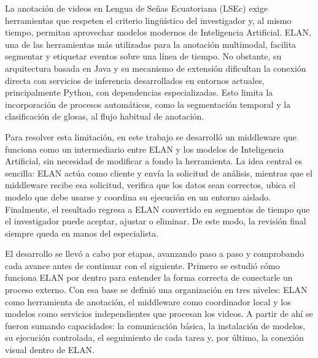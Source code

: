 
La anotación de videos en Lengua de Señas Ecuatoriana (LSEc) exige herramientas que respeten el criterio lingüístico del investigador y, al mismo tiempo, permitan aprovechar modelos modernos de Inteligencia Artificial. ELAN, una de las herramientas más utilizadas para la anotación multimodal, facilita segmentar y etiquetar eventos sobre una línea de tiempo. No obstante, su arquitectura basada en Java y su mecanismo de extensión dificultan la conexión directa con servicios de inferencia desarrollados en entornos actuales, principalmente Python, con dependencias especializadas. Esto limita la incorporación de procesos automáticos, como la segmentación temporal y la clasificación de glosas, al flujo habitual de anotación.

Para resolver esta limitación, en este trabajo se desarrolló un middleware que funciona como un intermediario entre ELAN y los modelos de Inteligencia Artificial, sin necesidad de modificar a fondo la herramienta. La idea central es sencilla: ELAN actúa como cliente y envía la solicitud de análisis, mientras que el middleware recibe esa solicitud, verifica que los datos sean correctos, ubica el modelo que debe usarse y coordina su ejecución en un entorno aislado. Finalmente, el resultado regresa a ELAN convertido en segmentos de tiempo que el investigador puede aceptar, ajustar o eliminar. De este modo, la revisión final siempre queda en manos del especialista.

El desarrollo se llevó a cabo por etapas, avanzando paso a paso y comprobando cada avance antes de continuar con el siguiente. Primero se estudió cómo funciona ELAN por dentro para entender la forma correcta de conectarle un proceso externo. Con esa base se definió una organización en tres niveles: ELAN como herramienta de anotación, el middleware como coordinador local y los modelos como servicios independientes que procesan los videos. A partir de ahí se fueron sumando capacidades: la comunicación básica, la instalación de modelos, su ejecución controlada, el seguimiento de cada tarea y, por último, la conexión visual dentro de ELAN.

